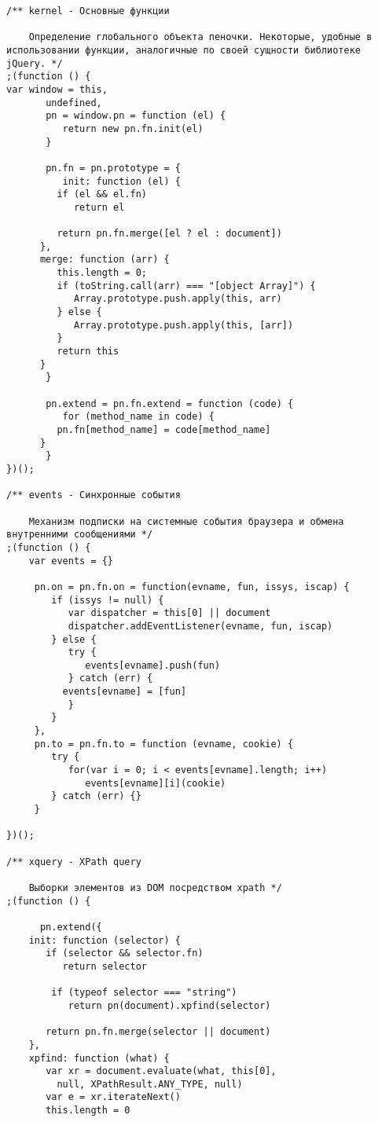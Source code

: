 \documentclass[a4papre,12pt]{article}
\begin{document}
\begin{verbatim}
/** kernel - Основные функции

    Определение глобального объекта пеночки. Некоторые, удобные в
использовании функции, аналогичные по своей сущности библиотеке
jQuery. */
;(function () {
var window = this,
       undefined,
       pn = window.pn = function (el) {
       	  return new pn.fn.init(el)
       }

       pn.fn = pn.prototype = {
          init: function (el) {
	     if (el && el.fn)
	     	return el

	     return pn.fn.merge([el ? el : document])
	  },
	  merge: function (arr) {
	     this.length = 0;
	     if (toString.call(arr) === "[object Array]") {
	     	Array.prototype.push.apply(this, arr)
	     } else {
	     	Array.prototype.push.apply(this, [arr])
	     }
	     return this
	  }
       }
       
       pn.extend = pn.fn.extend = function (code) {
       	  for (method_name in code) {
	     pn.fn[method_name] = code[method_name]
	  }
       }
})();

/** events - Синхронные события

    Механизм подписки на системные события браузера и обмена
внутренними сообщениями */
;(function () {
	var events = {}

	 pn.on = pn.fn.on = function(evname, fun, issys, iscap) {
	    if (issys != null) {
	       var dispatcher = this[0] || document
	       dispatcher.addEventListener(evname, fun, iscap)
	    } else {
	       try {
	       	  events[evname].push(fun)
	       } catch (err) {
		  events[evname] = [fun]
	       }
	    }
	 },
	 pn.to = pn.fn.to = function (evname, cookie) {
	    try {
	       for(var i = 0; i < events[evname].length; i++)
	          events[evname][i](cookie)
	    } catch (err) {}
	 }
   
})();

/** xquery - XPath query

    Выборки элементов из DOM посредством xpath */
;(function () {

      pn.extend({
	init: function (selector) {
	   if (selector && selector.fn) 
	      return selector

	    if (typeof selector === "string") 
	       return pn(document).xpfind(selector)

	   return pn.fn.merge(selector || document)
	},
	xpfind: function (what) {
	   var xr = document.evaluate(what, this[0], 
         null, XPathResult.ANY_TYPE, null)
	   var e = xr.iterateNext()
	   this.length = 0


\end{verbatim}
\end{document}
